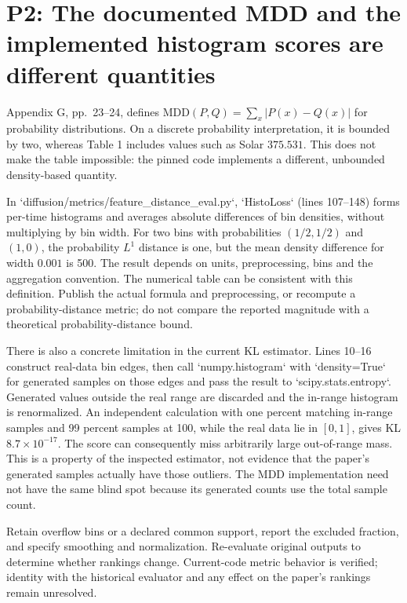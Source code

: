 \documentclass[10pt]{article}
\begin{document}
\section*{P2: The documented MDD and the implemented histogram scores are different quantities}
Appendix G, pp. 23–24, defines \(\mathrm{MDD}(P,Q)=\sum_x|P(x)-Q(x)|\) for probability distributions. On a discrete probability interpretation, it is bounded by two, whereas Table 1 includes values such as Solar \(375.531\). This does not make the table impossible: the pinned code implements a different, unbounded density-based quantity.\par
In `diffusion/metrics/feature\_distance\_eval.py`, `HistoLoss` (lines 107–148) forms per-time histograms and averages absolute differences of bin densities, without multiplying by bin width. For two bins with probabilities \((1/2,1/2)\) and \((1,0)\), the probability \(L^1\) distance is one, but the mean density difference for width \(0.001\) is 500. The result depends on units, preprocessing, bins and the aggregation convention. The numerical table can be consistent with this definition. Publish the actual formula and preprocessing, or recompute a probability-distance metric; do not compare the reported magnitude with a theoretical probability-distance bound.\par
There is also a concrete limitation in the current KL estimator. Lines 10–16 construct real-data bin edges, then call `numpy.histogram` with `density=True` for generated samples on those edges and pass the result to `scipy.stats.entropy`. Generated values outside the real range are discarded and the in-range histogram is renormalized. An independent calculation with one percent matching in-range samples and 99 percent samples at 100, while the real data lie in \([0,1]\), gives KL \(8.7\times10^{-17}\). The score can consequently miss arbitrarily large out-of-range mass. This is a property of the inspected estimator, not evidence that the paper’s generated samples actually have those outliers. The MDD implementation need not have the same blind spot because its generated counts use the total sample count.\par
Retain overflow bins or a declared common support, report the excluded fraction, and specify smoothing and normalization. Re-evaluate original outputs to determine whether rankings change. Current-code metric behavior is verified; identity with the historical evaluator and any effect on the paper’s rankings remain unresolved.\par
\end{document}
